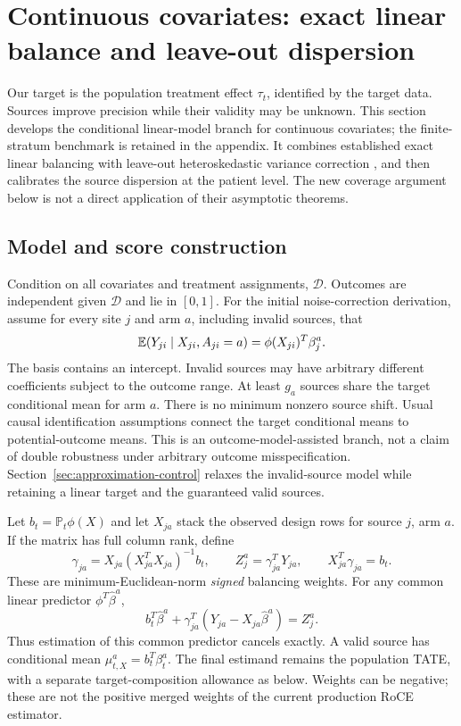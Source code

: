 \section{Continuous covariates: exact linear balance and leave-out dispersion}
\label{sec:continuous-balance}

Our target is the population treatment effect $\tau_t$, identified by the
target data. Sources improve precision while their validity may be unknown.
This section develops the conditional linear-model branch for continuous
covariates; the finite-stratum benchmark is retained in the appendix. It combines established exact linear balancing with
leave-out heteroskedastic variance correction \citep{arb2018,kss2020}, and
then calibrates the source dispersion at the patient level. The new coverage
argument below is not a direct application of their asymptotic theorems.

\subsection{Model and score construction}

Condition on all covariates and treatment assignments, $\mathcal D$. Outcomes
are independent given $\mathcal D$ and lie in $[0,1]$. For the initial noise-correction derivation, assume for every site $j$ and
arm $a$, including invalid sources, that
\[
 \mathbb E(Y_{ji}\mid X_{ji},A_{ji}=a)=\phi(X_{ji})^T\beta_j^a.
\]
The basis contains an intercept. Invalid sources may have arbitrary different
coefficients subject to the outcome range. At least $g_a$ sources share the
target conditional mean for arm $a$. There is no minimum nonzero source shift.
Usual causal identification assumptions connect the target conditional means
to potential-outcome means. This is an outcome-model-assisted branch, not a
claim of double robustness under arbitrary outcome misspecification.
Section~\ref{sec:approximation-control} relaxes the invalid-source model while
retaining a linear target and the guaranteed valid sources.

Let $b_t=\mathbb P_t\phi(X)$ and let $X_{ja}$ stack the observed design rows
for source $j$, arm $a$. If the matrix has full column rank, define
\[
 \gamma_{ja}=X_{ja}(X_{ja}^TX_{ja})^{-1}b_t,\qquad
 Z_j^a=\gamma_{ja}^TY_{ja},\qquad X_{ja}^T\gamma_{ja}=b_t.
\]
These are minimum-Euclidean-norm \emph{signed} balancing weights. For any
common linear predictor $\phi^T\widehat\beta^a$,
\[
 b_t^T\widehat\beta^a+
 \gamma_{ja}^T(Y_{ja}-X_{ja}\widehat\beta^a)=Z_j^a.
\]
Thus estimation of this common predictor cancels exactly. A valid source has
conditional mean $\mu_{t,X}^a=b_t^T\beta_t^a$. The final estimand remains the
population TATE, with a separate target-composition allowance as below.
Weights can be negative; these are not the positive merged weights of the
current production RoCE estimator.

